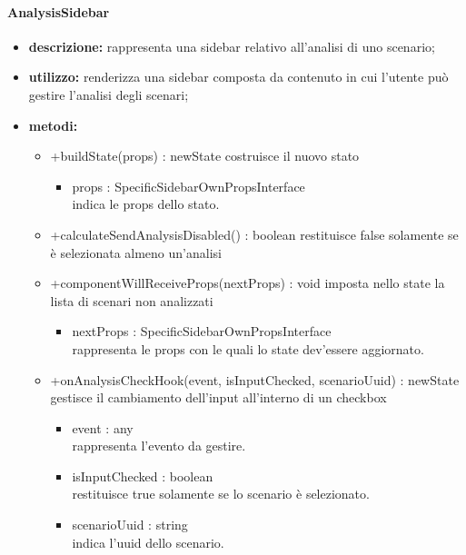 \paragraph{AnalysisSidebar}
\begin{itemize}
	\item \textbf{descrizione:} rappresenta una sidebar relativo all'analisi di uno scenario;
	\item \textbf{utilizzo:} renderizza una sidebar composta da contenuto in cui l'utente può gestire l'analisi degli scenari;
	\item \textbf{metodi:}
	\begin{itemize}
		\item +buildState(props) : newState\newline
		costruisce il nuovo stato
		\begin{itemize}
			\item props : SpecificSidebarOwnPropsInterface\\
			indica le props dello stato.
		\end{itemize}
		\item +calculateSendAnalysisDisabled() : boolean\newline
		restituisce false solamente se è selezionata almeno un'analisi
		\item +componentWillReceiveProps(nextProps) : void\newline
		imposta nello state la lista di scenari non analizzati
		\begin{itemize}
			\item nextProps : SpecificSidebarOwnPropsInterface\\
			rappresenta le props con le quali lo state dev'essere aggiornato.
		\end{itemize}
		\item +onAnalysisCheckHook(event, isInputChecked, scenarioUuid) : newState\newline
		gestisce il cambiamento dell'input all'interno di un checkbox
		\begin{itemize}
			\item event : any\\
			rappresenta l'evento da gestire.
			\item isInputChecked : boolean\\
			restituisce true solamente se lo scenario è selezionato.
			\item scenarioUuid : string\\
			indica l'uuid dello scenario.
		\end{itemize}

\end{itemize}
\end{itemize}

